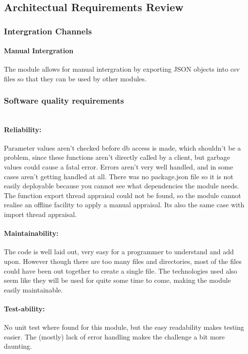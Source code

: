 \subsection{Architectual Requirements Review}

\subsubsection{Intergration Channels}
\paragraph {Manual Intergration}
The module allows for manual intergration by exporting JSON objects into csv files so that they can be used by other modules.
\par

\subsubsection{Software quality requirements} 

\paragraph{\\Reliability:}
Parameter values aren't checked before db access is made, which shouldn't be a problem, since these functions aren't directly called by a client, but garbage values could cause a fatal error. Errors aren't very well handled, and in some cases aren't getting handled at all. There was no package.json file so it is not easily deployable because you cannot see what dependencies the module needs. The function export thread appraisal could not be found, so the module cannot realise an offline facility to apply a manual appraisal. Its also the same case with import thread appraisal. 
\par
\paragraph{Maintainability:}
The code is well laid out, very easy for a programmer to understand and add upon. However though there are too many files and directories, most of the files could have been out together to create a single file. The technologies used also seem like they will be used for quite some time to come, making the module easily maintainable.
\par
\paragraph{Test-ability:}
 No unit test where found for this module, but the easy readability makes testing easier. The (mostly) lack of error handling makes the challenge a bit more daunting.
\par
